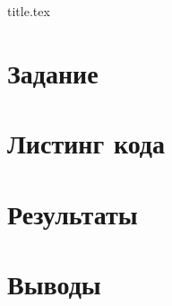 




{title.tex}

\clearpage



\clearpage
{}
\pagestyle{fancy}
\setcounter{page}{2}

\clearpage

\chapter{Задание}



\chapter{Листинг кода}


\chapter{Результаты}


\chapter*{Выводы}




